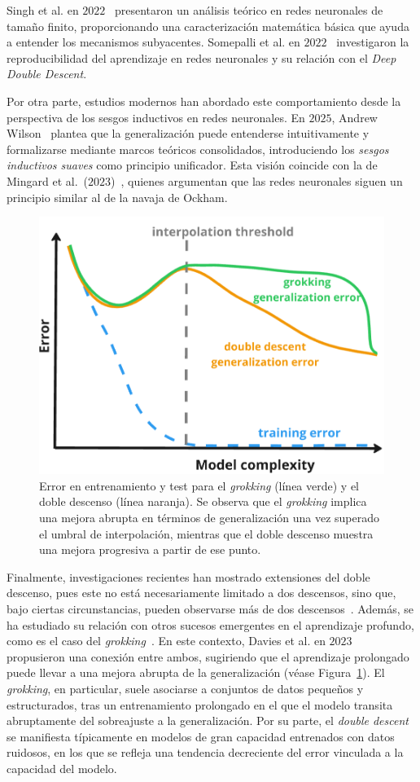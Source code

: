 Singh et al. en $2022$~\cite{Singh2022} presentaron un análisis teórico en redes neuronales de tamaño finito, proporcionando una caracterización matemática básica que ayuda a entender los mecanismos subyacentes. Somepalli et al. en $2022$~\cite{Somepalli2022} investigaron la reproducibilidad del aprendizaje en redes neuronales y su relación con el \textit{Deep Double Descent}.

Por otra parte, estudios modernos han abordado este comportamiento desde la perspectiva de los sesgos inductivos en redes neuronales. En $2025$, Andrew Wilson~\cite{Wilson2025} plantea que la generalización puede entenderse intuitivamente y formalizarse mediante marcos teóricos consolidados, introduciendo los \textit{sesgos inductivos suaves} como principio unificador. Esta visión coincide con la de Mingard et al.\ ($2023$)~\cite{Mingard2023}, quienes argumentan que las redes neuronales siguen un principio similar al de la navaja de Ockham.

\begin{figure}[h]
    \centering
    \includegraphics[width=0.5\linewidth]{img/grokking.png}
    \caption[\textit{Grokking} y \textit{Deep Double Descent}.]{Error en entrenamiento y test para el \textit{grokking} (línea verde) y el doble descenso (línea naranja). Se observa que el \textit{grokking} implica una mejora abrupta en términos de generalización una vez superado el umbral de interpolación, mientras que el doble descenso muestra una mejora progresiva a partir de ese punto.}\label{fig:grokking}
\end{figure}

Finalmente, investigaciones recientes han mostrado extensiones del doble descenso, pues este no está necesariamente limitado a dos descensos, sino que, bajo ciertas circunstancias, pueden observarse más de dos descensos~\cite{d_Ascoli2021, Chen2021}. Además, se ha estudiado su relación con otros sucesos emergentes en el aprendizaje profundo, como es el caso del \emph{grokking}~\cite{Power2022}. En este contexto, Davies et al. en $2023$~\cite{Davies2023} propusieron una conexión entre ambos, sugiriendo que el aprendizaje prolongado puede llevar a una mejora abrupta de la generalización (véase Figura~\ref{fig:grokking}). El \textit{grokking}, en particular, suele asociarse a conjuntos de datos pequeños y estructurados, tras un entrenamiento prolongado en el que el modelo transita abruptamente del sobreajuste a la generalización. Por su parte, el \textit{double descent} se manifiesta típicamente en modelos de gran capacidad entrenados con datos ruidosos, en los que se refleja una tendencia decreciente del error vinculada a la capacidad del modelo.

